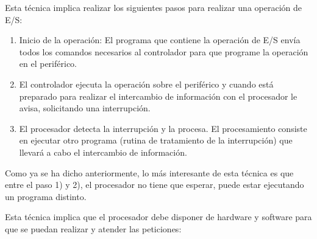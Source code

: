 Esta técnica implica realizar los siguientes pasos para realizar una operación de E/S: 

\begin{enumerate}
	\item Inicio de la operación: El programa que contiene la operación de E/S envía todos los comandos necesarios al 
	controlador para que programe la operación  en el periférico.
	\item El controlador ejecuta la operación sobre el periférico y cuando está preparado para realizar el intercambio de información con el procesador le avisa, solicitando una interrupción.
	\item El procesador detecta la interrupción y la procesa. El procesamiento consiste en ejecutar otro programa (rutina de tratamiento de la interrupción) que  llevará a cabo el intercambio de información.
\end{enumerate}

Como ya se ha dicho anteriormente, lo más interesante de esta técnica es que entre el paso 1) y 2), el procesador no tiene que esperar, puede estar ejecutando un programa distinto. 

Esta técnica implica que el procesador debe disponer de hardware y software para que se puedan realizar y atender las peticiones:


